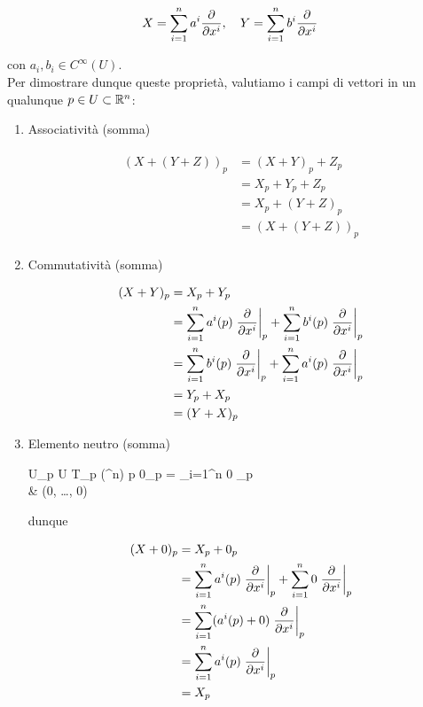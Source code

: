 {\begin{equation}
	X = \sum_{i=1}^{n} a^{i} \pdv{x^{i}} \qcomma Y = \sum_{i=1}^{n} b^{i} \pdv{x^{i}}
\end{equation}

con $ a_{i}, b_{i} \in C^{\infty}(U) $. \\
Per dimostrare dunque queste proprietà, valutiamo i campi di vettori in un qualunque $ p \in U \subset \mathbb{R}^{n} $:

\begin{enumerate}
	\item Associatività (somma)
	
	\begin{align}
		\begin{split}
			(X + (Y + Z))_{p} &= (X + Y)_{p} + Z_{p} \\
			&= X_{p} + Y_{p} + Z_{p} \\
			&= X_{p} + (Y + Z)_{p} \\
			&= (X + (Y + Z))_{p}
		\end{split}
	\end{align}
	
	\item Commutatività (somma)
	
	\begin{align}
		\begin{split}
			(X + Y)_{p} &= X_{p} + Y_{p} \\
			&= \sum_{i=1}^{n} a^{i} (p) \eval{ \pdv{x^{i}} }_{p} + \sum_{i=1}^{n} b^{i} (p) \eval{ \pdv{x^{i}} }_{p} \\
			&= \sum_{i=1}^{n} b^{i} (p) \eval{ \pdv{x^{i}} }_{p} + \sum_{i=1}^{n} a^{i} (p) \eval{ \pdv{x^{i}} }_{p} \\
			&= Y_{p} + X_{p} \\
			&= (Y + X)_{p}
		\end{split}
	\end{align}
	
	\item Elemento neutro (somma)
	
		{U}{\bigsqcup_{p \in U} T_{p} (\R^{n})}
		{p}{%
			0_{p} = \sum_{i=1}^{n} 0 _{p} \\
			& (0, \dots, 0)%
			}
	
	dunque
	
	\begin{align}
		\begin{split}
			(X + 0)_{p} &= X_{p} + 0_{p} \\
			&= \sum_{i=1}^{n} a^{i} (p) \eval{ \pdv{x^{i}} }_{p} + \sum_{i=1}^{n} 0 \eval{ \pdv{x^{i}} }_{p} \\
			&= \sum_{i=1}^{n} (a^{i} (p) + 0) \eval{ \pdv{x^{i}} }_{p} \\
			&= \sum_{i=1}^{n} a^{i} (p) \eval{ \pdv{x^{i}} }_{p} \\
			&= X_{p}
		\end{split}
	\end{align}
	

\end{enumerate}}
